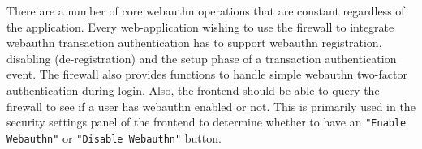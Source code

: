 There are a number of core webauthn operations that are constant regardless of the application. Every web-application wishing to use the firewall to integrate webauthn transaction authentication has to support webauthn registration, disabling (de-registration) and the setup phase of a transaction authentication event. The firewall also provides functions to handle simple webauthn two-factor authentication during login. Also, the frontend should be able to query the firewall to see if a user has webauthn enabled or not. This is primarily used in the security settings panel of the frontend to determine whether to  have an \lstinline{"Enable Webauthn"} or \lstinline{"Disable Webauthn"} button.










